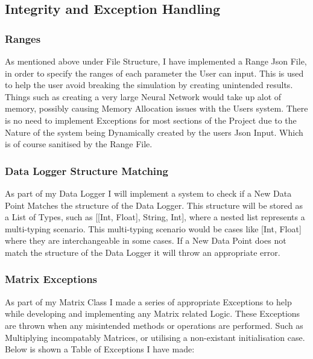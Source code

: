 \begin{flushleft}
        \subsection{Integrity and Exception Handling}
            \subsubsection{Ranges}
                As mentioned above under File Structure, I have implemented a Range Json File, in order to specify the ranges of each parameter the User can
                input. This is used to help the user avoid breaking the simulation by creating unintended results. Things such as creating a very large Neural
                Network would take up alot of memory, possibly causing Memory Allocation issues with the Users system. There is no need to implement Exceptions 
                for most sections of the Project due to the Nature of the system being Dynamically created by the users Json Input. Which is of course sanitised 
                by the Range File.
            \subsubsection{Data Logger Structure Matching}   
                As part of my Data Logger I will implement a system to check if a New Data Point Matches the structure of the Data Logger. This structure will
                be stored as a List of Types, such as [[Int, Float], String, Int], where a nested list represents a multi-typing scenario. This multi-typing 
                scenario would be cases like [Int, Float] where they are interchangeable in some cases. If a New Data Point does not match the structure of
                the Data Logger it will throw an appropriate error.
            \subsubsection{Matrix Exceptions}    
                As part of my Matrix Class I made a series of appropriate Exceptions to help while developing and implementing any Matrix related Logic. These
                Exceptions are thrown when any misintended methods or operations are performed. Such as Multiplying incompatably Matrices, or utilising a non-existant
                initialisation case. Below is shown a Table of Exceptions I have made:


\end{flushleft}
